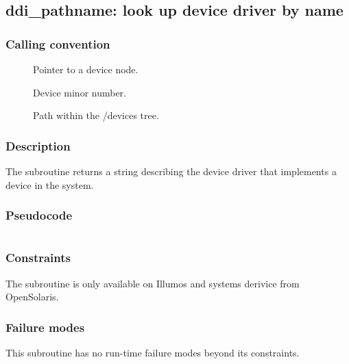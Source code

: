 \clearpage
{}
{}
\label{insn:dummy}
\subsection*{ddi\_pathname: look up device driver by name}

\subsubsection*{Calling convention}

\begin{description}
\item[] Pointer to a device node.
\item[] Device minor number.
\item[] Path within the /devices tree.
\end{description}

\subsubsection*{Description}

The  subroutine returns a string describing
the device driver that implements a device in the system.

\subsubsection*{Pseudocode}

\begin{verbatim}

\end{verbatim}

\subsubsection*{Constraints}

The  subroutine is only available on Illumos and
systems derivice from OpenSolaris.

\subsubsection*{Failure modes}

This subroutine has no run-time failure modes beyond its constraints.
